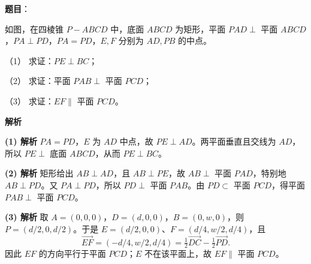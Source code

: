 \begin{answer}

\textbf{题目}：

如图，在四棱锥 $P-ABCD$ 中，底面 $ABCD$ 为矩形，平面 $PAD\perp$ 平面 $ABCD$，$PA\perp PD$，$PA=PD$，$E,F$ 分别为 $AD,PB$ 的中点。
\nopagebreak[4]
\begin{center}\end{center}
\nopagebreak[4]
（1） 求证：$PE\perp BC$；

（2） 求证：平面 $PAB\perp$ 平面 $PCD$；

（3） 求证：$EF\parallel$ 平面 $PCD$。

\textbf{解析}

\textbf{(1) 解析} $PA=PD$，$E$ 为 $AD$ 中点，故 $PE\perp AD$。两平面垂直且交线为 $AD$，所以 $PE\perp$ 底面 $ABCD$，从而 $PE\perp BC$。

\textbf{(2) 解析} 矩形给出 $AB\perp AD$，且 $AB\perp PE$，故 $AB\perp$ 平面 $PAD$，特别地 $AB\perp PD$。又 $PA\perp PD$，所以 $PD\perp$ 平面 $PAB$。由 $PD\subset$ 平面 $PCD$，得平面 $PAB\perp$ 平面 $PCD$。

\textbf{(3) 解析} 取 $A=(0,0,0)$，$D=(d,0,0)$，$B=(0,w,0)$，则 $P=(d/2,0,d/2)$。于是 $E=(d/2,0,0)$、$F=(d/4,w/2,d/4)$，且
\nopagebreak[4]
\[
\overrightarrow{EF}=(-d/4,w/2,d/4)
=\tfrac12\overrightarrow{DC}-\tfrac12\overrightarrow{PD}.
\]
因此 $EF$ 的方向平行于平面 $PCD$；$E$ 不在该平面上，故 $EF\parallel$ 平面 $PCD$。




\end{answer}
